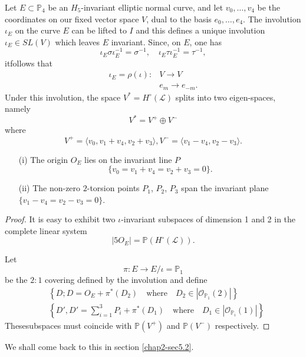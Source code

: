Let $E\subset \mathbb{P}_{4}$ be an $H_{5}$-invariant elliptic normal
curve, and let $v_{0},\ldots,v_{4}$ be the coordinates on our fixed
vector space $V$, dual to the basis $e_{0},\ldots,e_{4}$. The
involution $\iota_{E}$ on the curve $E$ can be lifted to $I$ and this
defines a unique involution $\iota_{E}\in SL(V)$ which leaves $E$
invariant. Since, on $E$, one has
$$
\iota_{E}\sigma \iota^{-1}_{E}=\sigma^{-1},\quad \iota_{E}\tau \iota_{E}^{-1}=\tau^{-1}, 
$$
it\pageoriginale follows that
\begin{align*}
\iota_{E}=\rho(\iota): & V\to V\\
& e_{m}\to e_{-m}.
\end{align*}
Under this involution, the space $V^{*}=H^{\circ}(\mathscr{L})$ splits
into two eigen-spaces, namely 
$$
V^{*}=V^{+}\oplus V^{-}
$$
where
$$
V^{+}=\langle v_{0},v_{1}+v_{4},v_{2}+v_{3}\rangle, V^{-}=\langle v_{1}-v_{4},v_{2}-v_{3}\rangle.
$$

\begin{lemma}\label{chap2-lem3}
\begin{itemize}
\item[\rm(i)] The origin $O_{E}$ lies on the invariant line $P$
$$
\{v_{0}=v_{1}+v_{4}=v_{2}+v_{3}=0\}.
$$

\item[\rm(ii)] The non-zero $2$-torsion points $P_{1}$, $P_{2}$,
$P_{3}$ span the invariant plane $\{v_{1}-v_{4}=v_{2}-v_{3}=0\}$.
\end{itemize}
\end{lemma}

\begin{proof}
It is easy to exhibit two $\iota$-invariant subspaces of dimension 1
and 2 in the complete linear system
$$
|5O_{E}|=\mathbb{P}(H^{\circ}(\mathscr{L})).
$$

Let
$$
\pi:E\to E/\iota=\mathbb{P}_{1}
$$
be the $2:1$ covering defined by the involution and define
\begin{align*}
& \left\{D; D=O_{E}+\pi^{*}(D_{2})\quad\text{where}\quad D_{2}\in
|\mathscr{O}_{\mathbb{P}_{1}}(2)|\right\}\\
& \left\{D',D'=\sum^{3}_{i=1}P_{i}+\pi^{*}(D_{1})\quad\text{where}\quad
D_{1}\in |\mathscr{O}_{\mathbb{P}_{i}}(1)|\right\}
\end{align*}
These\pageoriginale subspaces must coincide with $\mathbb{P}(V^{+})$
and $\mathbb{P}(V^{-})$ respectively.
\end{proof}

We shall come back to this in section \ref{chap2-sec5.2}.

